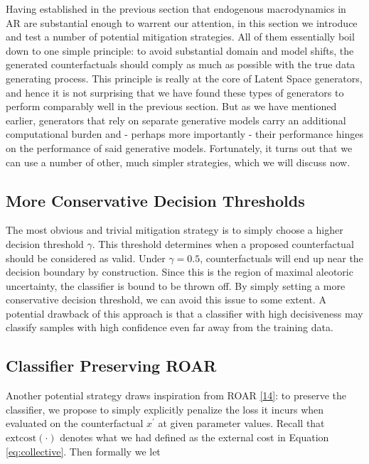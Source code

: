 \documentclass[conference,final,]{IEEEtran}
\begin{document}
Having established in the previous section that endogenous macrodynamics in AR are substantial enough to warrent our attention, in this section we introduce and test a number of potential mitigation strategies. All of them essentially boil down to one simple principle: to avoid substantial domain and model shifts, the generated counterfactuals should comply as much as possible with the true data generating process. This principle is really at the core of Latent Space generators, and hence it is not surprising that we have found these types of generators to perform comparably well in the previous section. But as we have mentioned earlier, generators that rely on separate generative models carry an additional computational burden and - perhaps more importantly - their performance hinges on the performance of said generative models. Fortunately, it turns out that we can use a number of other, much simpler strategies, which we will discuss now.

\hypertarget{more-conservative-decision-thresholds}{%
\subsection{More Conservative Decision Thresholds}\label{more-conservative-decision-thresholds}}

The most obvious and trivial mitigation strategy is to simply choose a higher decision threshold \(\gamma\). This threshold determines when a proposed counterfactual should be considered as valid. Under \(\gamma=0.5\), counterfactuals will end up near the decision boundary by construction. Since this is the region of maximal aleotoric uncertainty, the classifier is bound to be thrown off. By simply setting a more conservative decision threshold, we can avoid this issue to some extent. A potential drawback of this approach is that a classifier with high decisiveness may classify samples with high confidence even far away from the training data.

\hypertarget{classifier-preserving-roar}{%
\subsection{Classifier Preserving ROAR}\label{classifier-preserving-roar}}

Another potential strategy draws inspiration from ROAR \protect\hyperlink{ref-upadhyay2021towards}{{[}14{]}}: to preserve the classifier, we propose to simply explicitly penalize the loss it incurs when evaluated on the counterfactual \(x^\prime\) at given parameter values. Recall that \(\text{extcost}(\cdot)\) denotes what we had defined as the external cost in Equation \eqref{eq:collective}. Then formally we let
\end{document}
